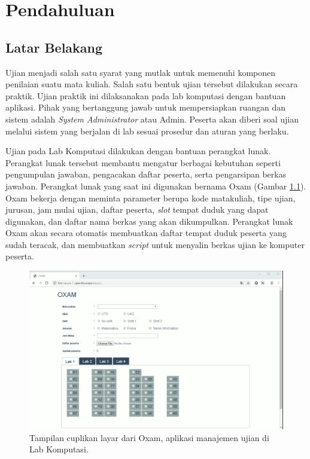 \chapter{Pendahuluan}
\label{chap:intro}
   
\section{Latar Belakang}
\label{sec:label}
Ujian menjadi salah satu syarat yang mutlak untuk memenuhi komponen penilaian
suatu mata kuliah. Salah satu bentuk ujian tersebut dilakukan secara praktik.
Ujian praktik ini dilaksanakan pada lab komputasi dengan bantuan aplikasi. Pihak
yang bertanggung jawab untuk mempersiapkan ruangan dan sistem adalah
\textit{System Administrator} atau Admin. Peserta akan diberi soal ujian melalui
sistem yang berjalan di lab sesuai prosedur dan aturan yang berlaku.

Ujian pada Lab Komputasi dilakukan dengan bantuan perangkat lunak. Perangkat
lunak tersebut membantu mengatur berbagai kebutuhan seperti pengumpulan jawaban,
pengacakan daftar peserta, serta pengarsipan berkas jawaban. Perangkat lunak
yang saat ini digunakan bernama Oxam (Gambar \ref{fig:ss-Oxam}). Oxam bekerja
dengan meminta parameter berupa kode matakuliah, tipe ujian, jurusan, jam mulai
ujian, daftar peserta, \textit{slot} tempat duduk yang dapat digunakan, dan
daftar nama berkas yang akan dikumpulkan. Perangkat lunak Oxam akan secara
otomatis membuatkan daftar tempat duduk peserta yang sudah teracak, dan
membuatkan \textit{script} untuk menyalin berkas ujian ke komputer peserta.

\begin{figure}
    \centering
    \includegraphics[width=0.7\paperwidth]{Gambar/ss-oxam.png}
    \caption{Tampilan cuplikan layar dari Oxam, aplikasi manajemen ujian di Lab Komputasi.}
    \label{fig:ss-Oxam}
\end{figure}

